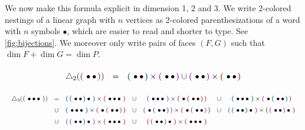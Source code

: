 \documentclass[twoside, 12pt]{amsart}
\theoremstyle{remark}
\begin{document}
We now make this formula explicit in dimension 1, 2 and 3. 
We write 2-colored nestings of a linear graph with $n$ vertices as 2-colored parenthesizations of a word with $n$ symbols $\bullet$, which are easier to read and shorter to type. See \cref{fig:bijections}. 
We moreover only write pairs of faces $(F,G)$ such that $\dim F + \dim G = \dim P$.

\begin{equation*}
  \begin{matrix}
      \triangle_2(\purple{\bullet \bullet}) & = & \blue{\bullet \bullet} \times \purple{\bullet \bullet} \cup \purple{\bullet \bullet} \times \red{\bullet \bullet}
  \end{matrix}
\end{equation*}

\[ \resizebox{\hsize}{!}{$\displaystyle{ 
 \renewcommand*{\arraystretch}{1.5}
  \begin{matrix}
      \triangle_3(\purple{\bullet \bullet \bullet}) 
      & = & \blue{\blue{\bullet \bullet} \bullet} \times \purple{\bullet \bullet \bullet} 
      & \cup & \purple{\bullet \bullet \bullet} \times \red{\bullet \red{\bullet \bullet}}
      & \cup & \blue{\bullet \bullet \bullet} \times \purple{\bullet \blue{\bullet \bullet}} \\
      & \cup & \blue{\bullet \bullet \bullet} \times \red{\bullet \purple{\bullet \bullet}}  
      & \cup & \purple{\bullet \blue{\bullet \bullet}} \times \red{\bullet \purple{\bullet \bullet}} 
      & \cup & \purple{\blue{\bullet \bullet} \bullet} \times \red{\purple{\bullet \bullet} \bullet} \\
      & \cup & \purple{\blue{\bullet \bullet} \bullet} \times \red{\bullet \bullet \bullet} 
      & \cup & \red{\purple{\bullet \bullet} \bullet} \times \red{\bullet \bullet \bullet} 
  \end{matrix} }$} \]
 
\end{document}
